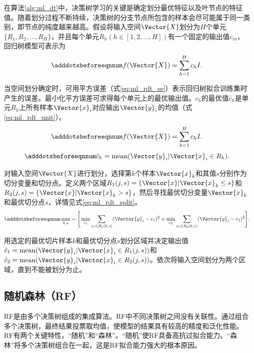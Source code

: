 在算法\ref{alg:ml_dt}中，决策树学习的关键是确定划分最优特征以及叶节点的特征值。随着划分过程不断持续，决策树的分支节点所包含的样本会尽可能属于同一类别，即节点的纯度越来越高。假设将输入空间$\Vector{X}$划分为$H$个单元$\{R_1,R_2,\ldots,R_H\}$，并且每个单元$R_h (h\in[1,2,\ldots,H])$有一个固定的输出值$c_m$，回归树模型可表示为
\begin{equation}\adddotsbeforeeqnnum
  \label{eq:ml_rdt}
  f(\Vector{X})=\sum_{h=1}^{H}c_hI.
\end{equation}

当空间划分确定时，可用平方误差（式\ref{eq:ml_rdt_se}）表示回归树拟合训练集时产生的误差。最小化平方误差可求得每个单元上的最优输出值。$c_h$的最优值$\hat{c}_h$是单元$R_h$上所有样本$\Vector{x}_i$对应输出$\Vector{y}_i$的均值（式\ref{eq:ml_rdt_unit}）。
\begin{equation}\adddotsbeforeeqnnum
  \label{eq:ml_rdt_se}
  f(\Vector{X})=\sum_{h=1}^{H}c_hI.
\end{equation}
\begin{equation}\adddotsbeforeeqnnum
  \label{eq:ml_rdt_unit}
  \hat{c}_h=\text{mean}(\Vector{y}_i|\Vector{x}_i\in R_h).
\end{equation}

对输入空间$\Vector{X}$进行划分，选择第$k$个样本$\Vector{x}_k$和其值$s$分别作为切分变量和切分点。定义两个区域$R_1(j,s)=\{\Vector{x}|\Vector{x}_k\le s\}$和$R_2(j,s)=\{\Vector{x}|\Vector{x}_k>s\}$，然后寻找最优切分变量$\Vector{x}_k$和最优切分点$s$，详情见式\ref{eq:ml_rdt_split}。
\begin{equation}\adddotsbeforeeqnnum
  \label{eq:ml_rdt_split}
  \min_{k,s}=\Bigg[\min_{c_1}^{}\sum_{x_i\in R_1(k,s)}(\Vector{y}_i-c_1)^2+\min_{c_2}^{}\sum_{x_i\in R_2(k,s)}(\Vector{y}_i-c_2)^2\Bigg].
\end{equation}

用选定的最优切片样本$k$和最优切分点$s$划分区域并决定输出值$\hat{c}_1=\text{mean}(\Vector{y}_i|\Vector{x}_i\in R_1(j,s))$和$\hat{c}_2=\text{mean}(\Vector{y}_i|\Vector{x}_i\in R_2(j,s))$。依次将输入空间划分为两个区域，直到不能被划分为止。

\subsection{随机森林（RF）}\label{sec:ml_rf}

RF是由多个决策树组成的集成算法。RF中不同决策树之间没有关联性。通过组合多个决策树，最终结果投票取均值，使模型的结果具有较高的精度和泛化性能。RF有两个关键特性，“随机”和“森林”。“随机”使RF具备高抗过拟合能力。“森林”将多个决策树组合在一起，这是RF拟合能力强大的根本原因。

